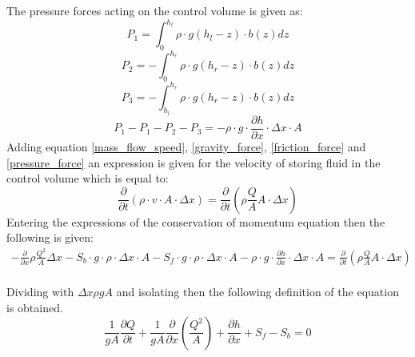 The pressure forces acting on the control volume is given as:
\begin{equation}
	P_1 = \int_{0}^{h_l} \rho \cdot g (h_l - z)\cdot b(z) dz
\end{equation}
\begin{equation}
	P_2 = -\int_{0}^{h_r} \rho \cdot g (h_r - z)\cdot b(z)dz
\end{equation}
\begin{equation}
	P_3 = -\int_{h_l}^{h_r} \rho \cdot g (h_r - z)\cdot b(z)dz
\end{equation}	
\begin{equation}
P_1 - P_1 -P_2 - P_3 = -\rho\cdot g \cdot \frac{\partial h}{\partial x} \cdot \Delta x \cdot A  
\label{pressure_force}
\end{equation}
Adding equation \ref{mass_flow_speed}, \ref{gravity_force}, \ref{friction_force} and \ref{pressure_force} an expression is given for the velocity of storing fluid in the control volume which is equal to:
\begin{equation}
\frac{\partial}{\partial t}(\rho\cdot v \cdot A\cdot \Delta x) = \frac{\partial}{\partial t} (\rho \frac{Q}{A}A\cdot \Delta x)
\end{equation}
Entering the expressions of the conservation of momentum equation then the following is given:
\\
\begin{equation}
\begin{array}{l}
- \frac{\partial}{\partial x} \rho \frac{Q^2}{A}\Delta x
-S_b \cdot g \cdot \rho \cdot \Delta x \cdot A -S_f \cdot g \cdot \rho \cdot \Delta x \cdot A  -\rho\cdot g \cdot \frac{\partial h}{\partial x} \cdot \Delta x \cdot A =\frac{\partial}{\partial t} (\rho \frac{Q}{A}A\cdot \Delta x)
\end{array}
\end{equation}
\\
Dividing with $\Delta x \rho g A$ and isolating then the following definition of the equation is obtained.
\\
\begin{equation}
\frac{1}{gA} \frac{\partial Q}{\partial t} +\frac{1}{gA}\frac{\partial}{\partial x} \left( \frac{Q^2}{A} \right) + \frac{\partial h}{\partial x} + S_f - S_b = 0
\label{saintbernard_momentum}
\end{equation}
\\

